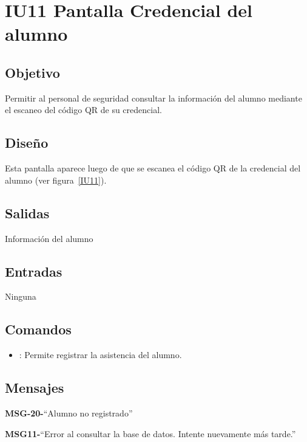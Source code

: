 \section{IU11 Pantalla Credencial del alumno}

\subsection{Objetivo}
	Permitir al personal de seguridad consultar la información del alumno mediante el escaneo del código QR de su credencial.

\subsection{Diseño}
Esta pantalla aparece luego de que se escanea el código QR de la credencial del alumno  (ver figura~\ref{IU11}).
	


\subsection{Salidas}
	Información del alumno

\subsection{Entradas}
Ninguna

\subsection{Comandos}
\begin{itemize}
	\item {}: Permite registrar la asistencia del alumno.
\end{itemize}

\subsection{Mensajes}

\begin{Citemize}
	\item {\bf MSG-20-}{``Alumno no registrado''}
	\item {\bf MSG11-}{``Error al consultar la base de datos. Intente nuevamente más tarde.''}
\end{Citemize}

